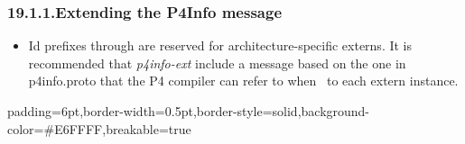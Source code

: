 \documentclass[11pt]{article}
\begin{document}
{%
\subsubsection{19.1.1.\hspace*{0.5em}Extending the P4Info message}\label{sec-extending-the-p4info-message}%

\begin{itemize}[noitemsep,topsep=\mdcompacttopsep]%

\item{}Id prefixes  through  are reserved for architecture-specific
externs. It is recommended that \emph{p4info-ext} include a  message based
on the one in p4info.proto that the P4 compiler can refer to when~ to each extern instance.%
\end{itemize}%

\begin{mdbmargintb}{6pt}{6pt}%
\begin{mdblock}{padding=6pt,border-width=0.5pt,border-style=solid,background-color=\#E6FFFF,breakable=true}%
\begin{mdpre}%
\end{mdpre}%
\end{mdblock}%
\end{mdbmargintb}%

\begin{itemize}[noitemsep,topsep=\mdcompacttopsep]%


\end{itemize}}
\end{document}
